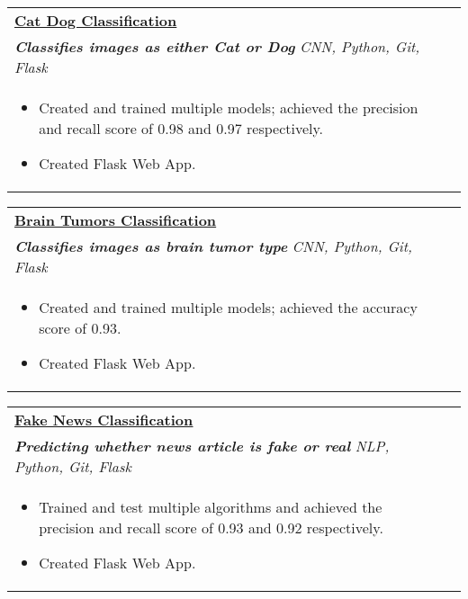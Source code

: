 \documentclass[a4paper,8pt]{article}
\begin{document}
\begin{tabularx}{\linewidth}{ @{}l r@{} }
\color[HTML]{1C033C} \textbf{\uline{\href{https://github.com/vikaschauhan734/cat_dog_classifier}{Cat Dog Classification}}}\\[4pt]
\color[HTML]{371e77}\textbf{\textit{Classifies images as either Cat or Dog}} \hfill \color[HTML]{4B28A4} \textit{CNN, Python, Git, Flask} \\[5pt]
\begin{minipage}[t]{\linewidth}
    \begin{itemize}[nosep,after=\strut, leftmargin=2em, itemsep=2pt]
        \item Created and trained multiple models; achieved the precision and recall score of 0.98 and 0.97 respectively.
	\item Created Flask Web App.
    \end{itemize}
    \end{minipage}
\end{tabularx}

\begin{tabularx}{\linewidth}{ @{}l r@{} }
\color[HTML]{1C033C} \textbf{\uline{\href{https://github.com/vikaschauhan734/brain_tumors_classification}{Brain Tumors Classification}}}\\[4pt]
\color[HTML]{371e77}\textbf{\textit{Classifies images as brain tumor type}} \hfill \color[HTML]{4B28A4} \textit{CNN, Python, Git, Flask} \\[5pt]
\begin{minipage}[t]{\linewidth}
    \begin{itemize}[nosep,after=\strut, leftmargin=2em, itemsep=2pt]
        \item Created and trained multiple models; achieved the accuracy score of 0.93.
	\item Created Flask Web App.
    \end{itemize}
    \end{minipage}
\end{tabularx}

\begin{tabularx}{\linewidth}{ @{}l r@{} }
\color[HTML]{1C033C} \textbf{\uline{\href{https://github.com/vikaschauhan734/fake_news_classifier}{Fake News Classification}}}\\[4pt]
\color[HTML]{371e77}\textbf{\textit{Predicting whether news article is fake or real}} \hfill \color[HTML]{4B28A4} \textit{NLP, Python, Git, Flask} \\[5pt]
\begin{minipage}[t]{\linewidth}
    \begin{itemize}[nosep,after=\strut, leftmargin=2em, itemsep=2pt]
        \item Trained and test multiple algorithms and achieved the precision and recall score of 0.93 and 0.92 respectively.
	\item Created Flask Web App.
    \end{itemize}
    \end{minipage}

\end{tabularx}
\end{document}

